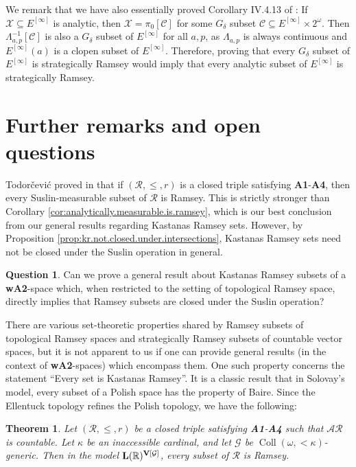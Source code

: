 \documentclass[11pt,reqno]{amsart}
\theoremstyle{plain}
\numberwithin{equation}{section}
\newtheorem{theorem}{Theorem}[section]
\theoremstyle{definition}
\newtheorem{qn}{Question}
\newcommand{\func}{\operatorname}
\newcommand{\R}{\mathbb{R}}
\newcommand{\cal}{\mathcal}
\renewcommand{\bf}{\mathbf}
\newcommand{\V}{\bf{V}}
\newcommand{\X}{\cal{X}}
\newcommand{\G}{\cal{G}}
\let\strokeL\L
\DeclareRobustCommand{\L}{\ifmmode\mathbf{L}\else\strokeL\fi}
\begin{document}
We remark that we have also essentially proved Corollary IV.4.13 of \cite{AT05}: If $\X \subseteq E^{[\infty]}$ is analytic, then $\X = \pi_0[\cal{C}]$ for some $G_\delta$ subset $\cal{C} \subseteq E^{[\infty]} \times 2^\omega$. Then $\Lambda_{a,p}^{-1}[\cal{C}]$ is also a $G_\delta$ subset of $E^{[\infty]}$ for all $a,p$, as $\Lambda_{a,p}$ is always continuous and $E^{[\infty]}(a)$ is a clopen subset of $E^{[\infty]}$. Therefore, proving that every $G_\delta$ subset of $E^{[\infty]}$ is strategically Ramsey would imply that every analytic subset of $E^{[\infty]}$ is strategically Ramsey.

\section{Further remarks and open questions}
Todor\v{c}evi\'{c} proved in \cite{T10} that if $(\cal{R},\leq,r)$ is a closed triple satisfying \textbf{A1}-\textbf{A4}, then every Suslin-measurable subset of $\cal{R}$ is Ramsey. This is strictly stronger than Corollary \ref{cor:analytically.measurable.is.ramsey}, which is our best conclusion from our general results regarding Kastanas Ramsey sets. However, by Proposition \ref{prop:kr.not.closed.under.intersections}, Kastanas Ramsey sets need not be closed under the Suslin operation in general.

\begin{qn}
    Can we prove a general result about Kastanas Ramsey subsets of a \textbf{wA2}-space which, when restricted to the setting of topological Ramsey space, directly implies that Ramsey subsets are closed under the Suslin operation?
\end{qn}

There are various set-theoretic properties shared by Ramsey subsets of topological Ramsey spaces and strategically Ramsey subsets of countable vector spaces, but it is not apparent to us if one can provide general results (in the context of \textbf{wA2}-spaces) which encompass them. One such property concerns the statement ``Every set is Kastanas Ramsey''. It is a classic result that in Solovay's model, every subset of a Polish space has the property of Baire. Since the Ellentuck topology refines the Polish topology, we have the following:

\begin{theorem}
    Let $(\cal{R},\leq,r)$ be a closed triple satisfying \textbf{A1}-\textbf{A4} such that $\cal{AR}$ is countable. Let $\kappa$ be an inaccessible cardinal, and let $\G$ be $\func{Coll}(\omega,<\kappa)$-generic. Then in the model $\L(\R)^{\V[\G]}$, every subset of $\cal{R}$ is Ramsey.
\end{theorem}
\end{document}
